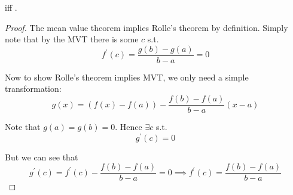 \documentclass{article}
\begin{document}
\begin{claim}
   iff .
\end{claim}

\begin{proof}
  The mean value theorem implies Rolle's theorem by definition. Simply note that by the MVT there is some $c$ s.t.
  \[
    f^\prime(c) = \dfrac{g(b) - g(a)}{b - a} = 0
  \]

  Now to show Rolle's theorem implies MVT, we only need a simple transformation:
  \[
    g(x) = \left(f(x) - f(a)\right) - \dfrac{f(b) - f(a)}{b - a} (x - a)
  \]

  Note that $g(a) = g(b) = 0$. Hence $\exists c$ s.t.
  \[
    g^\prime(c) = 0
  \]

  But we can see that
  \[
    g^\prime(c) = f^\prime(c) - \dfrac{f(b) - f(a)}{b - a} = 0
    \implies
    f^\prime(c) = \dfrac{f(b) - f(a)}{b - a}
  \]
\end{proof}
\end{document}
